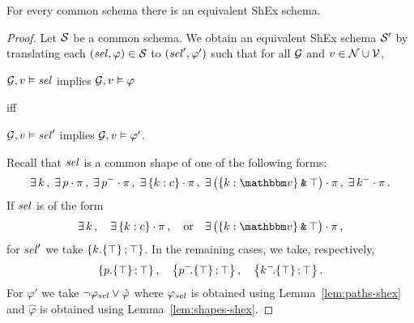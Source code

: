 \begin{lemma}
\label{lem:schemas-shex}
For every common schema there is an equivalent ShEx schema.  
\end{lemma}

\begin{proof} 
Let $\mathcal{S}$ be a common schema. We obtain an equivalent ShEx schema $\mathcal{S}'$ by translating each  $(\mathit{sel}, \varphi) \in \mathcal{S}$ to $(\mathit{sel}', \varphi')$ such that for all $\mathcal{G}$ and $v\in \mathcal{N}\cup\mathcal{V}$, 

\begin{center}
 $\mathcal{G}, v \vDash \mathit{sel}$ implies $\mathcal{G}, v \vDash \varphi$ 
 
 iff 
 
 $\mathcal{G}, v \vDash \mathit{sel}'$ implies $\mathcal{G}, v \vDash \varphi'$.
 \end{center}
 Recall that $\mathit{sel}$ is a common shape of one of the following forms:
\[ 
\exists\, k \,,\;
\exists\, p \cdot \pexpr\,, \;
\exists\, p^{-}\cdot \pexpr \,,\;
\exists\, \{k:c\}\cdot \pexpr \,, \;
\exists\, \big(\{k:\vtype\}\tAnd\top\big)\cdot \pexpr \,, \;
\exists\, k^{-}\cdot \pexpr\,.
\]
If $\mathit{sel}$ is of the form  \[\exists\, k\,,\quad \exists\, \{k:c\}\cdot \pi\,,\quad \text{or}\quad \exists\, \big(\{k:\vtype\}\tAnd \top\big)\cdot \pi\,,\] for $\mathit{sel}'$ we take $\left\{  k.\!\left\{ \top \right\} \mathop{;} \top \right\}$. In the remaining cases, we take, respectively, 
\[ 
\left\{  p.\!\left\{ \top \right\} \mathop{;} \top \right\},\quad
\left\{  p^{-}\!.\!\left\{ \top \right\} \mathop{;} \top \right\},\quad
\left\{  k^{-}\!.\!\left\{ \top \right\} \mathop{;} \top \right\}.
\]
For $\varphi'$ we take $\lnot \varphi_{\mathit{sel}} \lor \hat\varphi$ where $\varphi_{\mathit{sel}}$ is obtained using Lemma~\ref{lem:paths-shex}
 and $\hat\varphi$ is obtained using Lemma~\ref{lem:shapes-shex}. 
 \end{proof}


